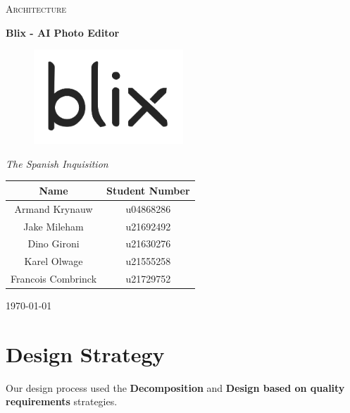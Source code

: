 \documentclass[11pt,a4paper]{article}
\begin{document}
\begin{titlepage}
	\centering
    {\scshape\LARGE Architecture\par}
    \vspace{1.5cm}
    {\huge\bfseries Blix - AI Photo Editor\par}
    \begin{figure}[h]
        \centering %
        \includegraphics[width=0.5\textwidth]{../pics/blix.png}
    \end{figure}
    \vspace{2.5cm}
    {\Large\itshape The Spanish Inquisition\par}
	\begin{tabular}{|c|c|}
		\hline
		\textbf{Name} 		& \textbf{Student Number} \\
		\hline
		Armand Krynauw		& u04868286  \\
		Jake Mileham		& u21692492  \\
		Dino Gironi			& u21630276  \\
		Karel Olwage		& u21555258  \\
		Francois Combrinck	& u21729752  \\
		\hline
	\end{tabular}
    \vfill
    {\large \today\par}
\end{titlepage}

\tableofcontents
\pagebreak


\section{Design Strategy}
Our design process used the \textbf{Decomposition} and \textbf{Design based on
quality requirements} strategies.
\end{document}
